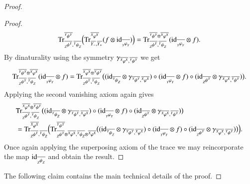 \documentclass{amsart}
\def\tn{\textnormal}
\def\Trace{\tn{Tr}}
\def\ol{\overline}
\def\id{\tn{id}}
\newcommand{\inp}[1]{{#1_-}}
\newcommand{\outp}[1]{{#1_+}}
\newcommand{\feeddd}[3]{{\tensor*[^{#2}_{\color{white}{!}}]{{#1}}{^{#3}}}}%
\newcommand{\feeddc}[3]{{\tensor*[^{#2}]{{#1}}{_{#3}}}}
\newcommand{\feedcd}[3]{{\tensor*[_{#2}]{{#1}}{^{#3}}}}
\newcommand{\feedcc}[3]{{\tensor*[^{\color{white}{!}}_{#2}]{{#1}}{_{#3}}}}
\theoremstyle{remark}
\theoremstyle{definition}
\begin{document}
\begin{proof}
\begin{proof}
\[\Trace^{\ol{\feeddd{\psi}{Y}{Y}}}_{\ol{\feedcd{\psi}{Z}{Y}},\ol{\feeddc{\psi}{Y}{Z}}}
\Big(\Trace^{\ol{\feeddd{\varphi}{X}{X}}}_{\ol{\inp{Y}},\ol{\outp{Y}}}(f\otimes\id_{\ol{\feedcc{\varphi}{Y}{Y}}})\Big)=\Trace^{\ol{\feeddd{\psi}{Y}{Y}}\otimes\ol{\feeddd{\varphi}{X}{X}}}_{\ol{\feedcd{\psi}{Z}{Y}},\ol{\feeddc{\psi}{Y}{Z}}}
(\id_{\ol{\feedcc{\varphi}{Y}{Y}}}\otimes f).\]
By dinaturality using the symmetry $\gamma_{\ol{\feeddd{\varphi}{X}{X}},\ol{\feeddd{\psi}{Y}{Y}}}$ we get
\[\Trace^{\ol{\feeddd{\psi}{Y}{Y}}\otimes\ol{\feeddd{\varphi}{X}{X}}}_{\ol{\feedcd{\psi}{Z}{Y}},\ol{\feeddc{\psi}{Y}{Z}}}
(\id_{\ol{\feedcc{\varphi}{Y}{Y}}}\otimes f)
=\Trace^{\ol{\feeddd{\varphi}{X}{X}}\otimes\ol{\feeddd{\psi}{Y}{Y}}}_{\ol{\feedcd{\psi}{Z}{Y}},\ol{\feeddc{\psi}{Y}{Z}}}
\big(
(\id_{\ol{\feeddc{\psi}{Y}{Z}}}\otimes\gamma_{\ol{\feeddd{\psi}{Y}{Y}},\ol{\feeddd{\varphi}{X}{X}}})\circ(\id_{\ol{\feedcc{\varphi}{Y}{Y}}}\otimes f)\circ(\id_{\ol{\feedcd{\psi}{Z}{Y}}}\otimes\gamma_{\ol{\feeddd{\varphi}{X}{X}},\ol{\feeddd{\psi}{Y}{Y}}})
\big).\]
Applying the second vanishing axiom again gives
\begin{align*}
&\Trace^{\ol{\feeddd{\varphi}{X}{X}}\otimes\ol{\feeddd{\psi}{Y}{Y}}}_{\ol{\feedcd{\psi}{Z}{Y}},\ol{\feeddc{\psi}{Y}{Z}}}
\big(
(\id_{\ol{\feeddc{\psi}{Y}{Z}}}\otimes\gamma_{\ol{\feeddd{\psi}{Y}{Y}},\ol{\feeddd{\varphi}{X}{X}}})\circ(\id_{\ol{\feedcc{\varphi}{Y}{Y}}}\otimes f)\circ(\id_{\ol{\feedcd{\psi}{Z}{Y}}}\otimes\gamma_{\ol{\feeddd{\varphi}{X}{X}},\ol{\feeddd{\psi}{Y}{Y}}})
\big)\\
&=\Trace^{\ol{\feeddd{\varphi}{X}{X}}}_{\ol{\feedcd{\psi}{Z}{Y}},\ol{\feeddc{\psi}{Y}{Z}}}
\Big(
\Trace^{\ol{\feeddd{\psi}{Y}{Y}}}_{\ol{\feedcd{\psi}{Z}{Y}}\otimes\ol{\feeddd{\varphi}{X}{X}},\ol{\feeddc{\psi}{Y}{Z}}\otimes\ol{\feeddd{\varphi}{X}{X}}}
\big(
(\id_{\ol{\feeddc{\psi}{Y}{Z}}}\otimes\gamma_{\ol{\feeddd{\psi}{Y}{Y}},\ol{\feeddd{\varphi}{X}{X}}})\circ(\id_{\ol{\feedcc{\varphi}{Y}{Y}}}\otimes f)\circ(\id_{\ol{\feedcd{\psi}{Z}{Y}}}\otimes\gamma_{\ol{\feeddd{\varphi}{X}{X}},\ol{\feeddd{\psi}{Y}{Y}}})
\big)
\Big).
\end{align*}
Once again applying the superposing axiom of the trace we may reincorporate the map $\id_{\ol{\feedcc{\psi}{Z}{Z}}}$ and obtain the result.
\end{proof}

The following claim contains the main technical details of the proof.


\end{proof}
\end{document}
